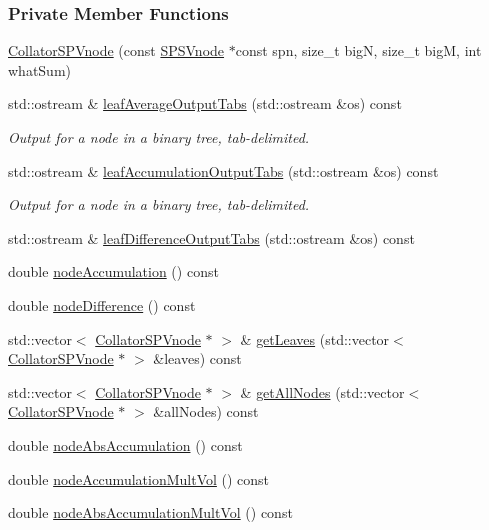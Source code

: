 \subsubsection*{\-Private \-Member \-Functions}
\begin{DoxyCompactItemize}
\item 
\hyperlink{classsubpavings_1_1CollatorSPVnode_a9f0d632933ae94b99777c01fa8d1677e}{\-Collator\-S\-P\-Vnode} (const \hyperlink{classsubpavings_1_1SPSVnode}{\-S\-P\-S\-Vnode} $\ast$const spn, size\-\_\-t big\-N, size\-\_\-t big\-M, int what\-Sum)
\item 
std\-::ostream \& \hyperlink{classsubpavings_1_1CollatorSPVnode_aac50041302262e7503e68cbd9103aa0b}{leaf\-Average\-Output\-Tabs} (std\-::ostream \&os) const 
\begin{DoxyCompactList}\small\item\em \-Output for a node in a binary tree, tab-\/delimited. \end{DoxyCompactList}\item 
std\-::ostream \& \hyperlink{classsubpavings_1_1CollatorSPVnode_a158da654dc12bf34a61950df57d2d742}{leaf\-Accumulation\-Output\-Tabs} (std\-::ostream \&os) const 
\begin{DoxyCompactList}\small\item\em \-Output for a node in a binary tree, tab-\/delimited. \end{DoxyCompactList}\item 
std\-::ostream \& \hyperlink{classsubpavings_1_1CollatorSPVnode_a20f7af5ed80d8860009cfd39f1dafc03}{leaf\-Difference\-Output\-Tabs} (std\-::ostream \&os) const 
\item 
double \hyperlink{classsubpavings_1_1CollatorSPVnode_a5fb3b27a05bb36fc409ed1ffe17cab9f}{node\-Accumulation} () const 
\item 
double \hyperlink{classsubpavings_1_1CollatorSPVnode_a8493e447407309758e72abcd2a6faf6a}{node\-Difference} () const 
\item 
std\-::vector$<$ \hyperlink{classsubpavings_1_1CollatorSPVnode}{\-Collator\-S\-P\-Vnode} $\ast$ $>$ \& \hyperlink{classsubpavings_1_1CollatorSPVnode_aab5d343b96bf5be2ef7ebfaa4ead0319}{get\-Leaves} (std\-::vector$<$ \hyperlink{classsubpavings_1_1CollatorSPVnode}{\-Collator\-S\-P\-Vnode} $\ast$ $>$ \&leaves) const 
\item 
std\-::vector$<$ \hyperlink{classsubpavings_1_1CollatorSPVnode}{\-Collator\-S\-P\-Vnode} $\ast$ $>$ \& \hyperlink{classsubpavings_1_1CollatorSPVnode_a49322e88d40a59c02bb6c3eb5841584a}{get\-All\-Nodes} (std\-::vector$<$ \hyperlink{classsubpavings_1_1CollatorSPVnode}{\-Collator\-S\-P\-Vnode} $\ast$ $>$ \&all\-Nodes) const 
\item 
double \hyperlink{classsubpavings_1_1CollatorSPVnode_acf8c07b59699383cc9983aefb8c8945d}{node\-Abs\-Accumulation} () const 
\item 
double \hyperlink{classsubpavings_1_1CollatorSPVnode_a0c350ae6fe0fc1719ec294f5828c64a6}{node\-Accumulation\-Mult\-Vol} () const 
\item 
double \hyperlink{classsubpavings_1_1CollatorSPVnode_ac89894e566fc5b4f86b2b9d749db10a1}{node\-Abs\-Accumulation\-Mult\-Vol} () const 
\end{DoxyCompactItemize}

